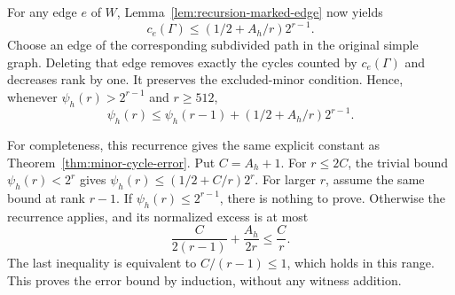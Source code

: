 For any edge $e$ of $W$, Lemma~\ref{lem:recursion-marked-edge} now yields
\[
 c_e(\Gamma)\le(1/2+A_h/r)2^{r-1}.
\]
Choose an edge of the corresponding subdivided path in the original simple graph.
Deleting that edge removes exactly the cycles counted by $c_e(\Gamma)$ and decreases rank by one.
It preserves the excluded-minor condition.
Hence, whenever $\psi_h(r)>2^{r-1}$ and $r\ge512$,
\[
 \psi_h(r)\le\psi_h(r-1)+(1/2+A_h/r)2^{r-1}.
\]

For completeness, this recurrence gives the same explicit constant as Theorem~\ref{thm:minor-cycle-error}.
Put $C=A_h+1$.
For $r\le2C$, the trivial bound $\psi_h(r)<2^r$ gives
$\psi_h(r)\le(1/2+C/r)2^r$.
For larger $r$, assume the same bound at rank $r-1$.
If $\psi_h(r)\le2^{r-1}$, there is nothing to prove.
Otherwise the recurrence applies, and its normalized excess is at most
\[
 \frac{C}{2(r-1)}+\frac{A_h}{2r}\le\frac Cr.
\]
The last inequality is equivalent to $C/(r-1)\le1$, which holds in this range.
This proves the error bound by induction, without any witness addition.
